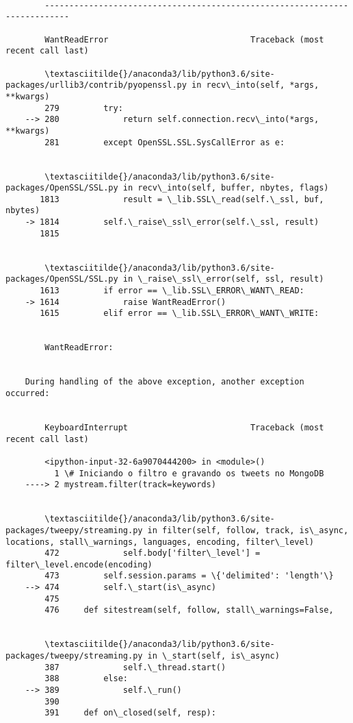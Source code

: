 \documentclass[11pt]{article}
\begin{document}
    \begin{Verbatim}[commandchars=\\\{\}]

        ---------------------------------------------------------------------------

        WantReadError                             Traceback (most recent call last)

        \textasciitilde{}/anaconda3/lib/python3.6/site-packages/urllib3/contrib/pyopenssl.py in recv\_into(self, *args, **kwargs)
        279         try:
    --> 280             return self.connection.recv\_into(*args, **kwargs)
        281         except OpenSSL.SSL.SysCallError as e:


        \textasciitilde{}/anaconda3/lib/python3.6/site-packages/OpenSSL/SSL.py in recv\_into(self, buffer, nbytes, flags)
       1813             result = \_lib.SSL\_read(self.\_ssl, buf, nbytes)
    -> 1814         self.\_raise\_ssl\_error(self.\_ssl, result)
       1815 


        \textasciitilde{}/anaconda3/lib/python3.6/site-packages/OpenSSL/SSL.py in \_raise\_ssl\_error(self, ssl, result)
       1613         if error == \_lib.SSL\_ERROR\_WANT\_READ:
    -> 1614             raise WantReadError()
       1615         elif error == \_lib.SSL\_ERROR\_WANT\_WRITE:


        WantReadError: 

        
    During handling of the above exception, another exception occurred:


        KeyboardInterrupt                         Traceback (most recent call last)

        <ipython-input-32-6a9070444200> in <module>()
          1 \# Iniciando o filtro e gravando os tweets no MongoDB
    ----> 2 mystream.filter(track=keywords)
    

        \textasciitilde{}/anaconda3/lib/python3.6/site-packages/tweepy/streaming.py in filter(self, follow, track, is\_async, locations, stall\_warnings, languages, encoding, filter\_level)
        472             self.body['filter\_level'] = filter\_level.encode(encoding)
        473         self.session.params = \{'delimited': 'length'\}
    --> 474         self.\_start(is\_async)
        475 
        476     def sitestream(self, follow, stall\_warnings=False,


        \textasciitilde{}/anaconda3/lib/python3.6/site-packages/tweepy/streaming.py in \_start(self, is\_async)
        387             self.\_thread.start()
        388         else:
    --> 389             self.\_run()
        390 
        391     def on\_closed(self, resp):



\end{Verbatim}
\end{document}
